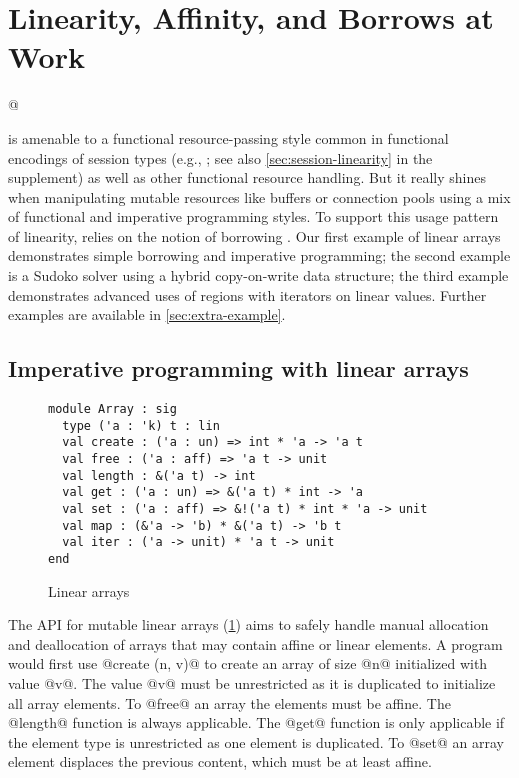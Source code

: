 \section{Linearity, Affinity, and Borrows at Work}
\label{motivation}

\lstMakeShortInline[keepspaces,basicstyle=\small\ttfamily]@

\lang{} is amenable to a functional resource-passing style
common in functional encodings of session types (e.g.,
\cite{DBLP:journals/jfp/Padovani17}; see also
\cref{sec:session-linearity} in the supplement) as well as other
functional resource handling. But it really shines
when manipulating mutable resources like buffers or connection pools
using a mix of functional and imperative programming styles.
%
To support this usage pattern of linearity, \lang{} relies on
the notion of borrowing \cite{DBLP:conf/popl/BoylandR05}. Our first
example of linear arrays demonstrates simple borrowing and
imperative programming; the second example is a Sudoko solver using a
hybrid copy-on-write data structure; the third example demonstrates advanced uses
of regions with iterators on linear values.
Further examples are available in \cref{sec:extra-example}.

\subsection{Imperative programming with linear arrays}
\label{sec:imper-progr}

\begin{figure}[tp]
  \centering
\begin{lstlisting}
module Array : sig
  type ('a : 'k) t : lin
  val create : ('a : un) => int * 'a -> 'a t
  val free : ('a : aff) => 'a t -> unit
  val length : &('a t) -> int
  val get : ('a : un) => &('a t) * int -> 'a
  val set : ('a : aff) => &!('a t) * int * 'a -> unit
  val map : (&'a -> 'b) * &('a t) -> 'b t
  val iter : ('a -> unit) * 'a t -> unit
end
\end{lstlisting}
  \vspace{-15pt}
  \caption{Linear arrays}
  \label{ex:array}
  \label{sig:array}
  \vspace{-10pt}
\end{figure}

The API for mutable linear arrays (\cref{sig:array})
aims to safely handle manual allocation and
deallocation of arrays that may contain affine or linear elements.
A program would first use @create (n, v)@ to create
an array of size @n@ initialized with value
@v@. The value @v@ must be unrestricted as it is duplicated to
initialize all array elements.
To @free@ an array the elements must be affine. 
The @length@ function is always applicable.
The @get@ function is only applicable
if the element type is unrestricted as one element is duplicated.
To @set@ an array element displaces the previous content, which must
be at least affine.

